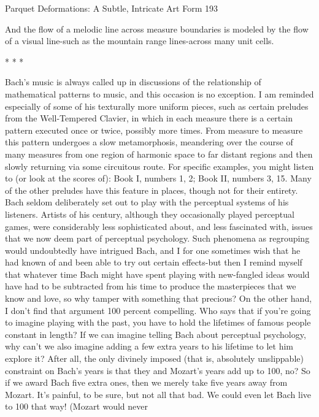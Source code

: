 Parquet Deformations: A Subtle, Intricate Art Form                                        193

And the flow of a melodic line across measure boundaries is modeled by the flow of a
visual line-such as the mountain range lines-across many unit cells.

                                         *   *   *

        Bach's music is always called up in discussions of the relationship of
mathematical patterns to music, and this occasion is no exception. I am reminded
especially of some of his texturally more uniform pieces, such as certain preludes from
the Well-Tempered Clavier, in which in each measure there is a certain pattern executed
once or twice, possibly more times. From measure to measure this pattern undergoes a
slow metamorphosis, meandering over the course of many measures from one region of
harmonic space to far distant regions and then slowly returning via some circuitous route.
For specific examples, you might listen to (or look at the scores of): Book I, numbers 1,
2; Book II, numbers 3, 15. Many of the other preludes have this feature in places, though
not for their entirety.
        Bach seldom deliberately set out to play with the perceptual systems of his
listeners. Artists of his century, although they occasionally played perceptual games,
were considerably less sophisticated about, and less fascinated with, issues that we now
deem part of perceptual psychology. Such phenomena as regrouping would undoubtedly
have intrigued Bach, and I for one sometimes wish that he had known of and been able to
try out certain effects-but then I remind myself that whatever time Bach might have spent
playing with new-fangled ideas would have had to be subtracted from his time to produce
the masterpieces that we know and love, so why tamper with something that precious?
        On the other hand, I don't find that argument 100 percent compelling. Who says
that if you're going to imagine playing with the past, you have to hold the lifetimes of
famous people constant in length? If we can imagine telling Bach about perceptual
psychology, why can't we also imagine adding a few extra years to his lifetime to let him
explore it? After all, the only divinely imposed (that is, absolutely unslippable) constraint
on Bach's years is that they and Mozart's years add up to 100, no? So if we award Bach
five extra ones, then we merely take five years away from Mozart. It's painful, to be sure,
but not all that bad. We could even let Bach live to 100 that way! (Mozart would never
